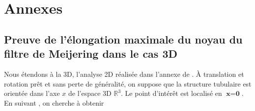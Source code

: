 %
\chapter{Annexes}
\label{sec:appendix}

\section{Preuve de l'élongation maximale du noyau du filtre de Meijering dans le cas 3D}
\label{APP:Proof of Meijering's maximal flatness for 3D case}

\fontsize{8pt}{12pt}\selectfont

Nous étendons à la 3D, l'analyse 2D réalisée dans l'annexe de \cite{Meijering2004_neurite_vesselness}.
À translation et rotation prêt et sans perte de généralité, on suppose que la structure tubulaire est orientée dans l'axe $x$ de l'espace 3D $\mathbb R^3$. Le point d'intérêt est localisé en $\textbf{x} = \textbf{0}$.
En suivant \cite{Meijering2004_neurite_vesselness}, on cherche à obtenir  

